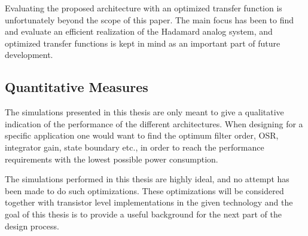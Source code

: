 Evaluating the proposed architecture with an optimized transfer function is unfortunately beyond the scope of this paper. The main focus has been to find and evaluate an efficient realization of the Hadamard analog system, and optimized transfer functions is kept in mind as an important part of future development.



\subsection{Quantitative Measures}
The simulations presented in this thesis are only meant to give a qualitative indication of the performance of the different architectures. When designing for a specific application one would want to find the optimum filter order, OSR, integrator gain, state boundary etc., in order to reach the performance requirements with the lowest possible power consumption.

The simulations performed in this thesis are highly ideal, and no attempt has been made to do such optimizations. These optimizations will be considered together with transistor level implementations in the given technology and the goal of this thesis is to provide a useful background for the next part of the design process.



